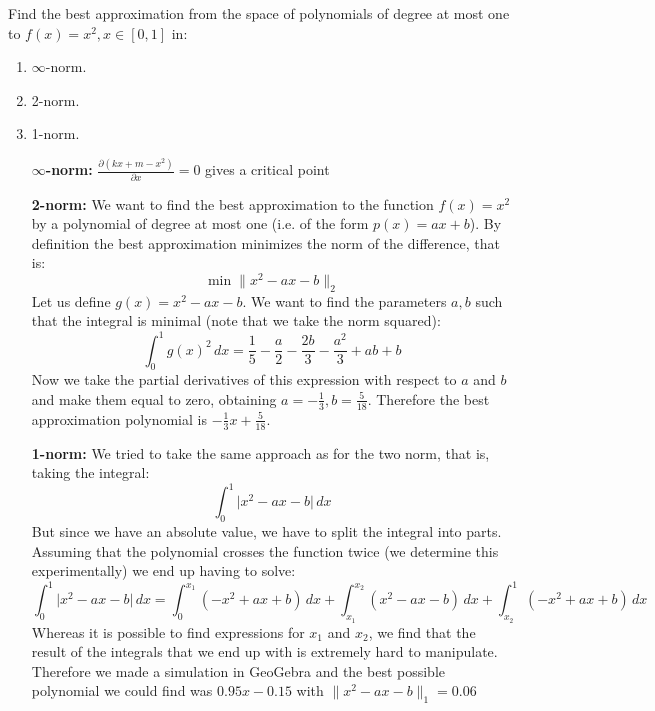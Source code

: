 \begin{problem}
Find the best approximation from the space of polynomials of degree at
most one to $f(x) = x^2 , x \in [0 , 1]$ in:
\begin{enumerate}
\item $\infty$-norm.
\item 2-norm.
\item 1-norm.
\end{enumerate}
\end{problem}

\begin{solution}
  \begin{enumerate}
  \item [{\bf $\infty$-norm: }]
    $\frac{\partial (kx + m - x^2)}{\partial x} = 0$ gives a critical
    point 

  \item[{\bf 2-norm: }]
  We want to find the best approximation to the function $f(x) = x^2$ by a polynomial of degree at most one (i.e. of the form $p(x) = ax+b$). By definition the best approximation minimizes the norm of the difference, that is:
  \begin{equation*}
  \min \lVert x^2-ax-b \rVert_2
  \end{equation*}
  Let us define $g(x) = x^2-ax-b$. We want to find the parameters $a, b$ such that the integral is minimal (note that we take the norm squared):
  \begin{equation*}
  \int_0^1 g(x)^2 \, dx = \frac{1}{5} - \frac{a}{2} - \frac{2b}{3} - \frac{a^2}{3} + ab+b
  \end{equation*}
  Now we take the partial derivatives of this expression with respect to $a$ and $b$ and make them equal to zero, obtaining $a = -\frac{1}{3}, b = \frac{5}{18}$. Therefore the best approximation polynomial is $-\frac{1}{3}x + \frac{5}{18}$.
    
  \item [{\bf 1-norm: }]
We tried to take the same approach as for the two norm, that is, taking the integral:
\begin{equation*}
\int_0^1 \lvert x^2-ax-b \rvert \, dx
\end{equation*}
But since we have an absolute value, we have to split the integral into parts. Assuming that the polynomial crosses the function twice (we determine this experimentally) we end up having to solve:
\begin{equation*}
\int_0^1 \lvert x^2-ax-b \rvert \, dx = \int_0^{x_1} (-x^2+ax+b) \, dx + \int_{x_1}^{x_2} (x^2-ax-b) \, dx+ \int_{x_2}^1 (-x^2+ax+b) \, dx
\end{equation*}
Whereas it is possible to find expressions for $x_1$ and $x_2$, we find that the result of the integrals that we end up with is extremely hard to manipulate. Therefore we made a simulation in GeoGebra and the best possible polynomial we could find was $0.95x-0.15$ with $\lVert x^2-ax-b \rVert_1 = 0.06$


\end{enumerate}
\end{solution}
